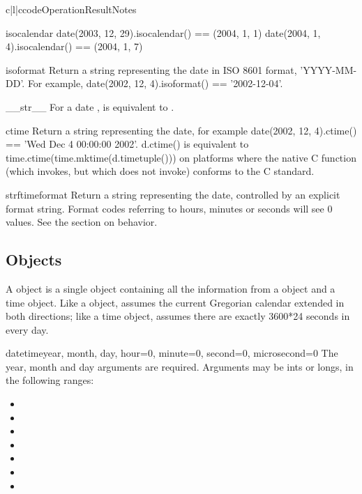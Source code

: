 \begin{tableiii}{c|l|c}{code}{Operation}{Result}{Notes}
\begin{methoddesc}{isocalendar}{}
    date(2003, 12, 29).isocalendar() == (2004, 1, 1)
    date(2004, 1, 4).isocalendar() == (2004, 1, 7)
\end{methoddesc}
\begin{methoddesc}{isoformat}{}
    Return a string representing the date in ISO 8601 format,
    'YYYY-MM-DD'.  For example,
    date(2002, 12, 4).isoformat() == '2002-12-04'.
\end{methoddesc}
\begin{methoddesc}{__str__}{}
    For a date ,  is equivalent to
    .
\end{methoddesc}
\begin{methoddesc}{ctime}{}
    Return a string representing the date, for example
    date(2002, 12, 4).ctime() == 'Wed Dec  4 00:00:00 2002'.
    d.ctime() is equivalent to time.ctime(time.mktime(d.timetuple()))
    on platforms where the native C  function
    (which  invokes, but which
     does not invoke) conforms to the C standard.
\end{methoddesc}
\begin{methoddesc}{strftime}{format}
    Return a string representing the date, controlled by an explicit
    format string.  Format codes referring to hours, minutes or seconds
    will see 0 values.
    See the section on  behavior.
\end{methoddesc}


\subsection{ Objects \label{datetime-datetime}}

A  object is a single object containing all the
information from a  object and a time object.  Like a
 object,  assumes the current Gregorian
calendar extended in both directions; like a time object,
 assumes there are exactly 3600*24 seconds in every
day.

\begin{funcdesc}datetime{year, month, day,
             hour=0, minute=0, second=0, microsecond=0}
The year, month and day arguments are required.  Arguments may be ints
or longs, in the following ranges:

\begin{itemize}
  \item {}
  \item {}
  \item {}
  \item {}
  \item {}
  \item {}
  \item {}
\end{itemize}


\end{funcdesc}
\end{tableiii}

